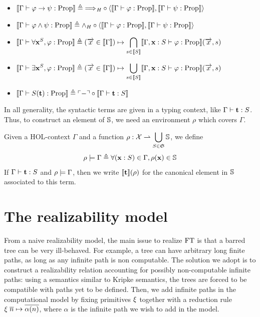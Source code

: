 \documentclass[a4paper,UKenglish,cleveref, autoref, thm-restate]{lipics-v2021}
\begin{document}
\begin{definition}[Semantics]
\begin{itemize}
  \item $\llbracket \Gamma\vdash \varphi \to \psi : \mathrm{Prop} \rrbracket \triangleq \implies\!\!\!_H\circ\langle\llbracket \Gamma\vdash \varphi : \mathrm{Prop} \rrbracket,\llbracket \Gamma\vdash \psi : \mathrm{Prop} \rrbracket\rangle$
  \item $\llbracket \Gamma\vdash \varphi \land \psi : \mathrm{Prop} \rrbracket \triangleq \land_H\circ\langle\llbracket \Gamma\vdash \varphi : \mathrm{Prop} \rrbracket, \llbracket \Gamma\vdash \psi : \mathrm{Prop} \rrbracket\rangle$
  \item $\displaystyle\llbracket \Gamma\vdash \forall \mathbf{x}^S, \varphi : \mathrm{Prop} \rrbracket \triangleq (\overrightarrow x \in \llbracket \Gamma \rrbracket) \mapsto \bigcap_{s \in \llbracket S \rrbracket} \llbracket \Gamma, \mathbf{x} : S\vdash \varphi : \mathrm{Prop} \rrbracket(\overrightarrow x, s)$
  \item $\displaystyle\llbracket \Gamma\vdash \exists \mathbf{x}^S, \varphi : \mathrm{Prop} \rrbracket \triangleq (\overrightarrow x \in \llbracket \Gamma \rrbracket) \mapsto \bigcup_{s \in \llbracket S \rrbracket} \llbracket \Gamma, \mathbf{x} : S\vdash \varphi : \mathrm{Prop} \rrbracket(\overrightarrow x, s)$
  \item $\llbracket \Gamma\vdash S(\mathbf{t}) : \mathrm{Prop} \rrbracket \triangleq \ulcorner-\urcorner \circ \llbracket \Gamma\vdash \mathbf{t} : S \rrbracket$
  \end{itemize}
\end{definition}

In all generality, the syntactic terms are given in a typing context, like $\Gamma\vdash \mathbf{t} : S$. Thus, to construct an element of $\mathbb S$, we need an environment $\rho$ which covers $\Gamma$.

\begin{notation}
  Given a HOL-context $\Gamma$ and a function $\displaystyle\rho : \mathcal X \rightharpoonup \bigcup_{S \in \mathfrak S} \mathbb S$, we define
  \[\rho\models \Gamma \triangleq \forall (\mathbf{x} : S) \in \Gamma, \rho(\mathbf{x}) \in \mathbb S\]
  If $\Gamma \vdash \mathbf{t} : S$ and $\rho\models \Gamma$, then we write 
  $\llbracket \mathbf{t} \rrbracket(\rho)$ for the canonical element in $\mathbb S$ associated to this term.
\end{notation}



\section{The realizability model}
\label{s:realizability}





From a naive realizability model, the main issue to realize $\mathrm{FT}$ is
that a barred tree can be very ill-behaved.
For example, a tree can have arbitrary long finite paths,
as long as any infinite path is non computable.
The solution we adopt is to construct a realizability relation accounting
for possibly non-computable infinite paths:
using a semantics similar to Kripke semantics, the trees are forced to be
compatible with paths yet to be defined.
Then, we add infinite paths in the computational model by fixing
primitives $\xi$ together with a reduction rule $\xi\;\overline{n} \mapsto \overline{\alpha(n)}$,
where $\alpha$ is the infinite path we wish to add in the model.
\end{document}

